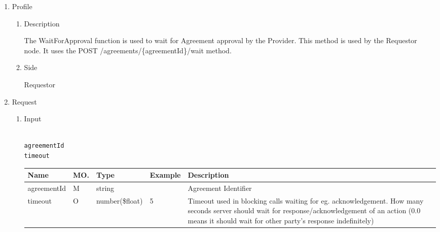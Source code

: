 \begin{enumerate}

\item Profile

\begin{enumerate}

\item Description

The WaitForApproval function is used to wait for Agreement approval by the Provider. This method is used by the Requestor node. 
It uses the POST /agreements/\{agreementId\}/wait method.

\item Side

Requestor

\end{enumerate}

\item Request

\begin{enumerate}

\item Input

\begin{tcolorbox}[boxrule=0pt, frame empty]
\begin{verbatim}

agreementId
timeout

\end{verbatim}
\end{tcolorbox}


\begin{table}[H]
\footnotesize

\begin{center}
\begin{tabular}{|p{3cm}|l|p{3cm}|p{3cm}|p{4cm}|} 
\hline
\rowcolor{lightgray}	Name	& MO.	& Type	& Example & 	Description \\
\hline

agreementId		& M & 	string				&		& 	Agreement Identifier \\
\hline

timeout 		& O	& 	number(\$float)				&	5	&	Timeout used in blocking calls waiting for eg. acknowledgement. 
																How many seconds server should wait for response/acknowledgement of an action 
																(0.0 means it should wait for other party's response indefinitely)	\\ 
\hline


\end{tabular}
\end{center}
\end{table}
\end{enumerate}
\end{enumerate}

